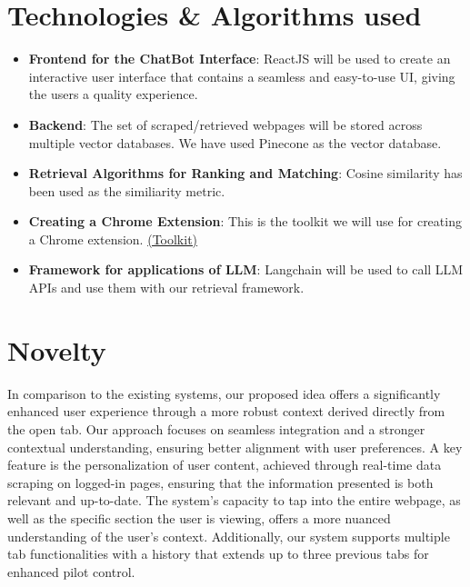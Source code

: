 \documentclass[sigconf,natbib=true,anonymous=false]{acmart}
\begin{document}
\section{Technologies \& Algorithms used}
\begin{itemize}
    \item {\textbf{Frontend for the ChatBot Interface}}: ReactJS will be used to create an interactive user interface that contains a seamless and easy-to-use UI, giving the users a quality experience.
    \item {\textbf{Backend}}: The set of scraped/retrieved webpages will be stored across multiple vector databases. We have used Pinecone as the vector database. 
    \item {\textbf{Retrieval Algorithms for Ranking and Matching}}: Cosine similarity has been used as the similiarity metric.

    \item \textbf{Creating a Chrome Extension}: This is the toolkit we will use for creating a Chrome extension. \href{https://developer.chrome.com/docs/extensions/get-started}{(Toolkit)}
    \item {\textbf{Framework for applications of LLM}}: Langchain will be used to call LLM APIs and use them with our retrieval framework.
\end{itemize}
\section{Novelty}

In comparison to the existing systems, our proposed idea offers a significantly enhanced user experience through a more robust context derived directly from the open tab. Our approach focuses on seamless integration and a stronger contextual understanding, ensuring better alignment with user preferences. A key feature is the personalization of user content, achieved through real-time data scraping on logged-in pages, ensuring that the information presented is both relevant and up-to-date. The system's capacity to tap into the entire webpage, as well as the specific section the user is viewing, offers a more nuanced understanding of the user's context. Additionally, our system supports multiple tab functionalities with a history that extends up to three previous tabs for enhanced pilot control.
\end{document}

